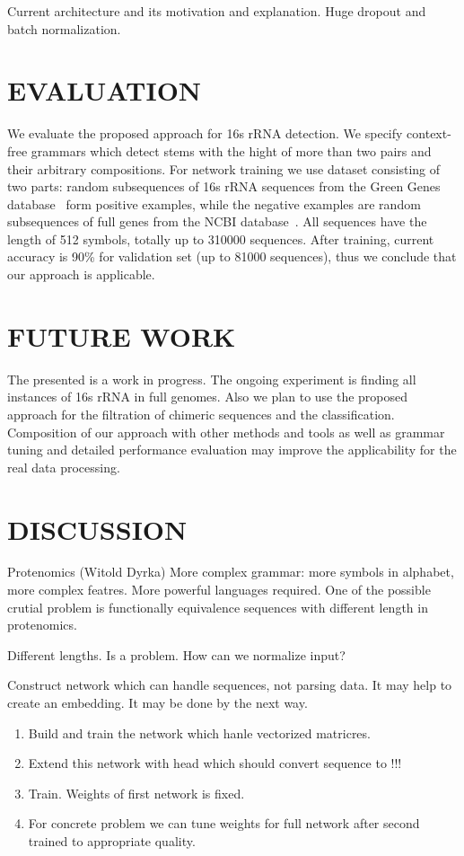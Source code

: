 \documentclass[a4paper,twoside]{article}
\begin{document}
Current architecture and its motivation and explanation.
Huge dropout and batch normalization.

\section{\uppercase{Evaluation}}
\label{sec:evaluation}

\noindent We evaluate the proposed approach for 16s rRNA detection.
We specify context-free grammars which detect stems with the hight of more than two pairs and their arbitrary compositions.
For network training we use dataset consisting of two parts: random subsequences of 16s rRNA sequences from the Green Genes database~\cite{pmid16820507} form positive examples, while the negative examples are random subsequences of full genes from the NCBI database~\cite{pmid19854944}.
All sequences have the length of 512 symbols, totally up to 310000 sequences.
After training, current accuracy is 90\% for validation set (up to 81000 sequences), thus we conclude that our approach is applicable.

\section{\uppercase{Future Work}}
\label{sec:FutureWork}

\noindent The presented is a work in progress. 
The ongoing experiment is finding all instances of 16s rRNA in full genomes.
Also we plan to use the proposed approach for the filtration of chimeric sequences and the classification.
Composition of our approach with other methods and tools as well as grammar tuning and detailed performance evaluation may improve the applicability for the real data processing.


\section{\uppercase{Discussion}}
\label{sec:Discussion}

Protenomics (Witold Dyrka)
More complex grammar: more symbols in alphabet, more complex featres.
More powerful languages required.
One of the possible crutial problem is functionally equivalence sequences with different length in protenomics.

Different lengths. Is a problem.
How can we normalize input?

Construct network which can handle sequences, not parsing data.
It may help to create an embedding.
It may be done by the next way.
\begin{enumerate}
\item Build and train the network which hanle vectorized matricres.
\item Extend this network with head which should convert sequence to !!!
\item Train. Weights of first network is fixed.
\item For concrete problem we can tune weights for full network after second trained to appropriate quality.
\end{enumerate}
\end{document}
